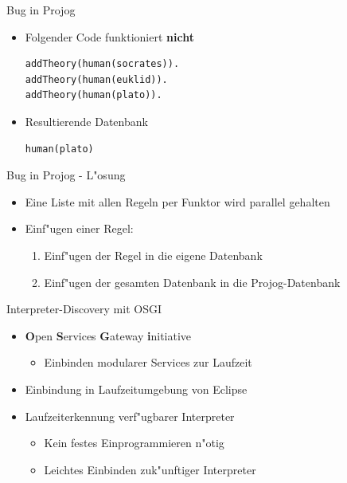 \documentclass[18pt]{beamer}
\begin{document}
\begin{frame}[fragile]{Bug in Projog}
\begin{itemize}
\item Folgender Code funktioniert \textbf{nicht}
\begin{verbatim}
addTheory(human(socrates)).
addTheory(human(euklid)).
addTheory(human(plato)).
\end{verbatim}
\vspace{0.5cm}
\item Resultierende Datenbank
\begin{verbatim}
human(plato)
\end{verbatim}
\end{itemize}
\end{frame}
\begin{frame}{Bug in Projog - L"osung}
\begin{itemize}
\item Eine Liste mit allen Regeln per Funktor wird parallel gehalten
\vspace{0.5cm}
\item Einf"ugen einer Regel:
\begin{enumerate}
\item Einf"ugen der Regel in die eigene Datenbank
\item Einf"ugen der gesamten Datenbank in die Projog-Datenbank
\end{enumerate}
\end{itemize}
\end{frame}
\begin{frame}{Interpreter-Discovery mit OSGI}
\begin{itemize}
\item \textbf{O}pen \textbf{S}ervices \textbf{G}ateway \textbf{i}nitiative
\begin{itemize}
\item Einbinden modularer Services zur Laufzeit
\end{itemize}
\vspace{0.1cm}
\item Einbindung in Laufzeitumgebung von Eclipse
\vspace{0.1cm}
\item Laufzeiterkennung verf"ugbarer Interpreter
\begin{itemize}
\item Kein festes Einprogrammieren n"otig
\item Leichtes Einbinden zuk"unftiger Interpreter
\end{itemize}
\end{itemize}
\end{frame}
\end{document}
